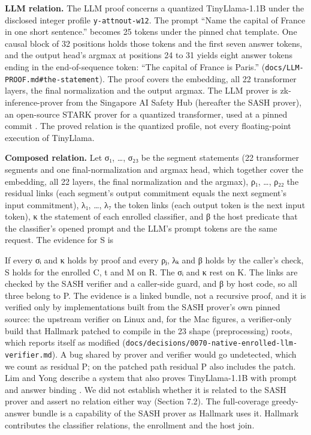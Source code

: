 \documentclass[11pt]{article}
\begin{document}
\textbf{LLM relation.} The LLM proof concerns a quantized TinyLlama-1.1B under the disclosed integer profile \texttt{y-\allowbreak{}attnout-\allowbreak{}w12}. The prompt ``Name the capital of France in one short sentence.'' becomes 25 tokens under the pinned chat template. One causal block of 32 positions holds those tokens and the first seven answer tokens, and the output head's argmax at positions 24 to 31 yields eight answer tokens ending in the end-of-sequence token: ``The capital of France is Paris.'' (\texttt{docs/\allowbreak{}LLM-\allowbreak{}PROOF.\allowbreak{}md\#the-\allowbreak{}statement}). The proof covers the embedding, all 22 transformer layers, the final normalization and the output argmax. The LLM prover is zk-inference-prover from the Singapore AI Safety Hub (hereafter the SASH prover), an open-source STARK prover for a quantized transformer, used at a pinned commit \cite{SASH}. The proved relation is the quantized profile, not every floating-point execution of TinyLlama.

\textbf{Composed relation.} Let σ₁, …, σ₂₃ be the segment statements (22 transformer segments and one final-normalization and argmax head, which together cover the embedding, all 22 layers, the final normalization and the argmax), ρ₁, …, ρ₂₂ the residual links (each segment's output commitment equals the next segment's input commitment), λ₁, …, λ₇ the token links (each output token is the next input token), κ the statement of each enrolled classifier, and β the host predicate that the classifier's opened prompt and the LLM's prompt tokens are the same request. The evidence for S is

\begin{center}\end{center}

If every σᵢ and κ holds by proof and every ρⱼ, λₖ and β holds by the caller's check, S holds for the enrolled C, t and M on R. The σᵢ and κ rest on K. The links are checked by the SASH verifier and a caller-side guard, and β by host code, so all three belong to P. The evidence is a linked bundle, not a recursive proof, and it is verified only by implementations built from the SASH prover's own pinned source: the upstream verifier on Linux and, for the Mac figures, a verifier-only build that Hallmark patched to compile in the 23 shape (preprocessing) roots, which reports itself as modified (\texttt{docs/\allowbreak{}decisions/\allowbreak{}0070-\allowbreak{}native-\allowbreak{}enrolled-\allowbreak{}llm-\allowbreak{}verifier.\allowbreak{}md}). A bug shared by prover and verifier would go undetected, which we count as residual P; on the patched path residual P also includes the patch. Lim and Yong describe a system that also proves TinyLlama-1.1B with prompt and answer binding \cite{A22}. We did not establish whether it is related to the SASH prover and assert no relation either way (Section 7.2). The full-coverage greedy-answer bundle is a capability of the SASH prover as Hallmark uses it. Hallmark contributes the classifier relations, the enrollment and the host join.
\end{document}
